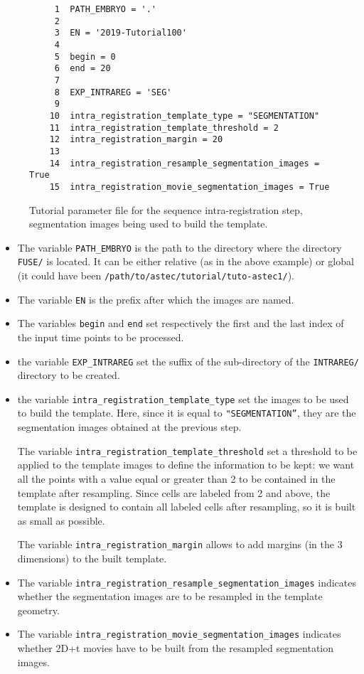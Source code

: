 \begin{figure}
\begin{framed}
\begin{verbatim}
     1	PATH_EMBRYO = '.'
     2	
     3	EN = '2019-Tutorial100'
     4	
     5	begin = 0
     6	end = 20
     7	
     8	EXP_INTRAREG = 'SEG'
     9	
    10	intra_registration_template_type = "SEGMENTATION"
    11	intra_registration_template_threshold = 2
    12	intra_registration_margin = 20
    13	
    14	intra_registration_resample_segmentation_images = True
    15	intra_registration_movie_segmentation_images = True
\end{verbatim}
\end{framed}
\caption{\label{fig:tutorial:parameter:intra:registration:seg} Tutorial
  parameter file for the sequence intra-registration step,
  segmentation images being used to build the template.}
\end{figure}

\begin{itemize}
  \itemsep -1ex
  \item The variable \texttt{PATH\_EMBRYO} is the path to the directory where
    the directory \texttt{FUSE/} is located. It can be either relative (as in the
    above example) or
    global (it could have been \texttt{/path/to/astec/tutorial/tuto-astec1/}).
  \item The variable \texttt{EN} is the prefix after which the  images
    are named. 
  \item The variables \texttt{begin} and \texttt{end} set respectively the
    first and the last index of the input time points to be processed.
  \item  the variable \texttt{EXP\_INTRAREG} set the suffix of the
    sub-directory of the \texttt{INTRAREG/} directory to be created.
  \item  the variable \texttt{intra\_registration\_template\_type} set
    the images to be used to build the template. Here, since it is
    equal to \texttt{"SEGMENTATION''}, they are the
    segmentation images obtained at the previous step.

    The variable \texttt{intra\_registration\_template\_threshold} set
    a threshold to be applied to the template images to define the
    information to be kept: we want all the points with a value equal
    or greater than 2 to be contained in the template after
    resampling. Since cells are labeled from 2 and above, the template
    is designed to contain all labeled cells after resampling, so it
    is built as small as possible.

    The variable \texttt{intra\_registration\_margin} allows to add
    margins (in the 3 dimensions) to the built template.
    
  \item The variable
    \texttt{intra\_registration\_resample\_segmentation\_images}
    indicates whether the segmentation images are to be resampled in
    the template geometry. 
  \item The variable
    \texttt{intra\_registration\_movie\_segmentation\_images}
    indicates whether 2D+t movies have to be built from the resampled
    segmentation images.
\end{itemize}

